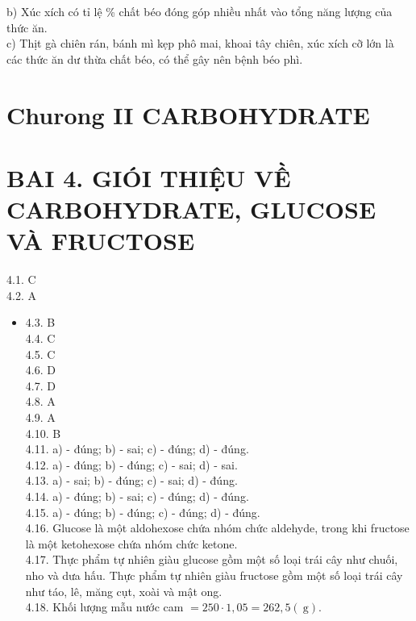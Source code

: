 \documentclass[10pt]{article}
\begin{document}
b) Xúc xích có tỉ lệ \% chất béo đóng góp nhiều nhất vào tổng năng lượng của thức ăn.\\
c) Thịt gà chiên rán, bánh mì kẹp phô mai, khoai tây chiên, xúc xích cỡ lớn là các thức ăn dư thừa chất béo, có thể gây nên bệnh béo phì.

\section*{Churong II CARBOHYDRATE}
\section*{BAI 4. GIÓI THIỆU VỀ CARBOHYDRATE, GLUCOSE VÀ FRUCTOSE}
4.1. C\\
4.2. A

\begin{itemize}
  \item 4.3. B\\
4.4. C\\
4.5. C\\
4.6. D\\
4.7. D\\
4.8. A\\
4.9. A\\
4.10. B\\
4.11. a) - đúng; b) - sai; c) - đúng; d) - đúng.\\
4.12. a) - đúng; b) - đúng; c) - sai; d) - sai.\\
4.13. a) - sai; b) - đúng; c) - sai; d) - đúng.\\
4.14. a) - đúng; b) - sai; c) - đúng; d) - đúng.\\
4.15. a) - đúng; b) - đúng; c) - đúng; d) - đúng.\\
4.16. Glucose là một aldohexose chứa nhóm chức aldehyde, trong khi fructose là một ketohexose chứa nhóm chức ketone.\\
4.17. Thực phẩm tự nhiên giàu glucose gồm một số loại trái cây như chuối, nho và dưa hấu. Thực phẩm tự nhiên giàu fructose gồm một số loại trái cây như táo, lê, măng cụt, xoài và mật ong.\\
4.18. Khối lượng mẫu nước cam $=250 \cdot 1,05=262,5(\mathrm{~g})$.
\end{itemize}
\end{document}
